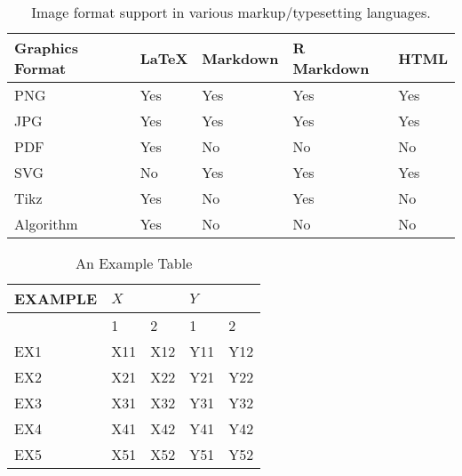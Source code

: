 

\begin{table}[htbp]
    \centering
    \begin{tabular}{l | llll }
     \hline
     Graphics Format & LaTeX & Markdown & R Markdown & HTML \\
     \hline
     PNG       & Yes & Yes & Yes & Yes \\
     JPG       & Yes & Yes & Yes & Yes \\
     PDF       & Yes & No & No & No \\
     SVG       & No & Yes & Yes & Yes \\
     Tikz      & Yes & No & Yes & No \\
     Algorithm & Yes & No & No & No \\
    \hline
    \end{tabular}
    \caption{Image format support in various markup/typesetting languages.}
    \label{table:1}
\end{table}
\begin{table}
    \begin{tabular}{l | llll }
     EXAMPLE & $X$  & & $Y$ & \\
     \hline
      & 1 & 2 & 1 & 2 \\
     EX1  & X11 & X12 &  Y11  & Y12 \\
     EX2  & X21 & X22 &  Y21  & Y22 \\
     EX3  & X31 & X32 &  Y31  & Y32 \\
     EX4  & X41 & X42 &  Y41  & Y42\\
     EX5  & X51 & X52 &  Y51  & Y52 \\
    \end{tabular}
    \caption{An Example Table}
\label{table1}
\end{table}

